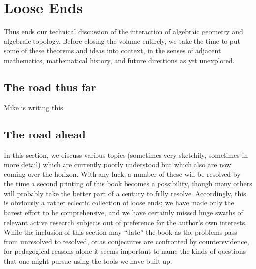 
\chapter{Loose Ends}




Thus ends our technical discussion of the interaction of algebraic geometry and algebraic topology.  Before closing the volume entirely, we take the time to put some of these theorems and ideas into context, in the senses of adjacent mathematics, mathematical history, and future directions as yet unexplored.



\section{The road thus far}

\begin{center}
\Huge Mike is writing this.
\end{center}






\section{The road ahead}\label{OpenQuestionsSection}




In this section, we discuss various topics (sometimes very sketchily, sometimes in more detail) which are currently poorly understood but which also are now coming over the horizon.  With any luck, a number of these will be resolved by the time a second printing of this book becomes a possibility, though many others will probably take the better part of a century to fully resolve.  Accordingly, this is obviously a rather eclectic collection of loose ends; we have made only the barest effort to be comprehensive, and we have certainly missed huge swaths of relevant active research subjects out of preference for the author's own interests.  While the inclusion of this section may ``date'' the book as the problems pass from unresolved to resolved, or as conjectures are confronted by counterevidence, for pedagogical reasons alone it seems important to name the kinds of questions that one might pursue using the tools we have built up.

